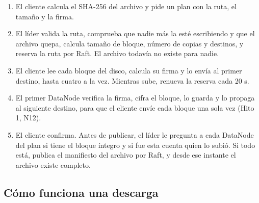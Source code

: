 \documentclass[10pt]{article}
\begin{document}
\begin{enumerate}
\item El cliente calcula el SHA-256 del archivo y pide un plan con la ruta, el tamaño y la firma.
\item El líder valida la ruta, comprueba que nadie más la esté escribiendo y que el archivo quepa, calcula tamaño de bloque, número de copias y destinos, y reserva la ruta por Raft. El archivo todavía no existe para nadie.
\item El cliente lee cada bloque del disco, calcula su firma y lo envía al primer destino, hasta cuatro a la vez. Mientras sube, renueva la reserva cada 20 s.
\item El primer DataNode verifica la firma, cifra el bloque, lo guarda y lo propaga al siguiente destino, para que el cliente envíe cada bloque una sola vez (Hito 1, N12).
\item El cliente confirma. Antes de publicar, el líder le pregunta a cada DataNode del plan si tiene el bloque íntegro y si fue esta cuenta quien lo subió. Si todo está, publica el manifiesto del archivo por Raft, y desde ese instante el archivo existe completo.
\end{enumerate}

\subsection{Cómo funciona una descarga}

\begin{center}
\end{center}
\end{document}
